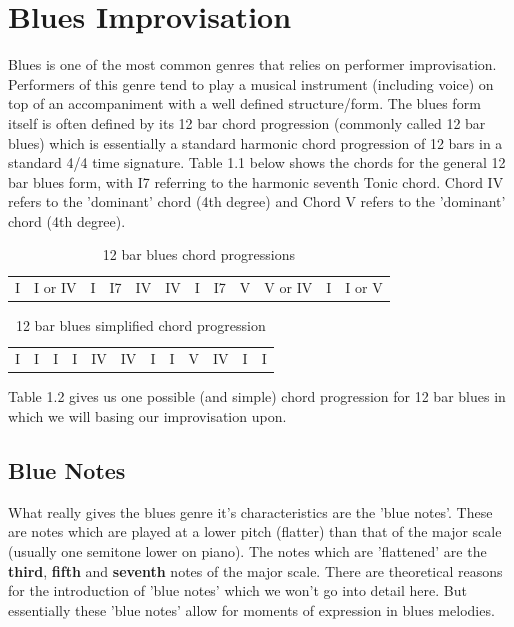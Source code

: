 \documentclass[pdftex,12pt,a4paper]{report}
\begin{document}
\section{Blues Improvisation}
Blues is one of the most common genres that relies on performer improvisation. Performers of this genre tend to play a musical instrument (including voice) on top of an accompaniment with a well defined structure/form. The blues form itself is often defined by its 12 bar chord progression (commonly called 12 bar blues) which is essentially a standard harmonic chord progression of 12 bars in a standard 4/4 time signature. Table 1.1 below shows the chords for the general 12 bar blues form, with I7 referring to the harmonic seventh Tonic chord. Chord IV refers to the 'dominant' chord (4th degree) and Chord V refers to the 'dominant' chord (4th degree).


\begin{table}[here]
\centering
{}
\begin{tabular}{|*{12}{C|}}
  I & I or IV & I & I7 & IV & IV & I & I7 & V & V or IV & I & I or V
\end{tabular}
\caption{12 bar blues chord progressions}
\label{12 bar blues}
\end{table}


\begin{table}[here]
\centering
{}
\begin{tabular}{|*{12}{C|}}
  I & I & I & I & IV & IV & I & I & V & IV & I & I
\end{tabular}
\caption{12 bar blues simplified chord progression}
\label{12 bar blues}
\end{table}


Table 1.2 gives us one possible (and simple) chord progression for 12 bar blues in which we will basing our improvisation upon. 


\subsection{Blue Notes} What really gives the blues genre it's characteristics are the 'blue notes'. These are notes which are played at a lower pitch (flatter) than that of the major scale (usually one semitone lower on piano). The notes which are 'flattened' are the \textbf{third}, \textbf{fifth} and \textbf{seventh} notes of the major scale.
There are theoretical reasons for the introduction of 'blue notes' which we won't go into detail here. But essentially these 'blue notes' allow for moments of expression in blues melodies. 
\end{document}
